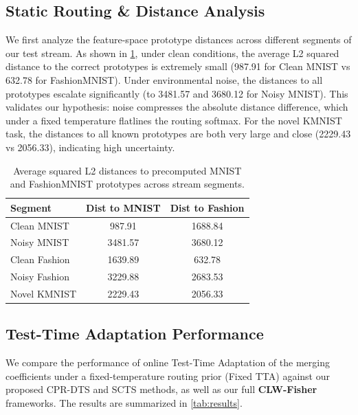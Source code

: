 \documentclass{article}
\theoremstyle{plain}
\theoremstyle{definition}
\theoremstyle{remark}
\begin{document}
\subsection{Static Routing \& Distance Analysis}
We first analyze the feature-space prototype distances across different segments of our test stream. As shown in \cref{tab:distances}, under clean conditions, the average L2 squared distance to the correct prototypes is extremely small (987.91 for Clean MNIST vs 632.78 for FashionMNIST). Under environmental noise, the distances to all prototypes escalate significantly (to 3481.57 and 3680.12 for Noisy MNIST). This validates our hypothesis: noise compresses the absolute distance difference, which under a fixed temperature flatlines the routing softmax. For the novel KMNIST task, the distances to all known prototypes are both very large and close (2229.43 vs 2056.33), indicating high uncertainty.

\begin{table}[ht]
  \centering
  \caption{Average squared L2 distances to precomputed MNIST and FashionMNIST prototypes across stream segments.}
  \label{tab:distances}
  \vskip 0.15in
  \begin{small}
    \scshape
    \begin{tabular}{lcc}
      \toprule
      Segment & Dist to MNIST & Dist to Fashion \\
      \midrule
      Clean MNIST & 987.91 & 1688.84 \\
      Noisy MNIST & 3481.57 & 3680.12 \\
      Clean Fashion & 1639.89 & 632.78 \\
      Noisy Fashion & 3229.88 & 2683.53 \\
      Novel KMNIST & 2229.43 & 2056.33 \\
      \bottomrule
    \end{tabular}
  \end{small}
  \vskip -0.1in
\end{table}

\subsection{Test-Time Adaptation Performance}
We compare the performance of online Test-Time Adaptation of the merging coefficients under a fixed-temperature routing prior (Fixed TTA) against our proposed CPR-DTS and SCTS methods, as well as our full \textbf{CLW-Fisher} frameworks. The results are summarized in \cref{tab:results}.
\end{document}
